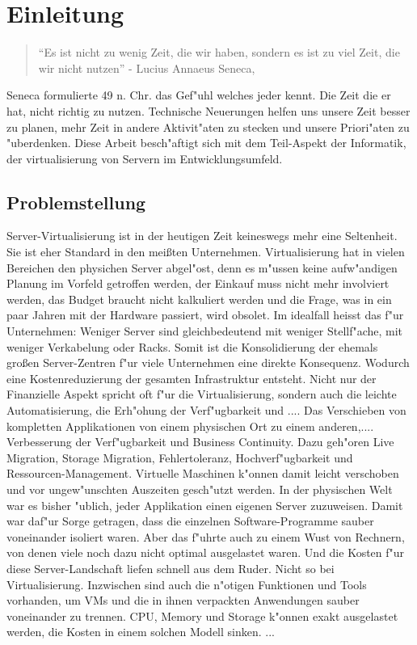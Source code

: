\chapter{Einleitung}

\begin{quote}
	``Es ist nicht zu wenig Zeit, die wir haben, sondern es ist zu viel Zeit, die wir nicht nutzen'' - Lucius Annaeus Seneca, \cite{Apelt200511}
\end{quote}
Seneca formulierte  49 n. Chr. das Gef"uhl welches jeder kennt. Die Zeit die er hat, nicht richtig zu nutzen.
Technische Neuerungen helfen uns unsere Zeit besser zu planen, mehr Zeit in andere Aktivit"aten zu stecken und unsere Priori"aten zu "uberdenken.
Diese Arbeit besch"aftigt sich mit dem Teil-Aspekt der Informatik, der virtualisierung von Servern im Entwicklungsumfeld.

\section{Problemstellung}
Server-Virtualisierung ist in der heutigen Zeit keineswegs mehr eine Seltenheit. Sie ist eher Standard in den mei{\ss}ten Unternehmen.\newline
Virtualisierung hat in vielen Bereichen den physichen Server abgel"ost, denn es m"ussen keine aufw"andigen Planung im Vorfeld getroffen werden, der Einkauf muss nicht mehr involviert werden, das Budget braucht nicht kalkuliert werden und die Frage, was in ein paar Jahren mit der Hardware passiert, wird obsolet.\newline
Im idealfall heisst das f"ur Unternehmen: Weniger Server sind gleichbedeutend mit weniger Stellf"ache, mit weniger Verkabelung oder Racks. Somit ist die Konsolidierung der ehemals gro{\ss}en Server-Zentren f"ur viele Unternehmen eine direkte Konsequenz. 
Wodurch eine Kostenreduzierung der gesamten Infrastruktur entsteht.\newline
Nicht nur der Finanzielle Aspekt spricht oft f"ur die Virtualisierung, sondern auch die leichte Automatisierung, die Erh"ohung der Verf"ugbarkeit und ....\newline
Das Verschieben von kompletten Applikationen von einem physischen Ort zu einem anderen,....\newline
Verbesserung der Verf"ugbarkeit und Business Continuity. Dazu geh"oren Live Migration, Storage Migration, Fehlertoleranz, Hochverf"ugbarkeit und Ressourcen-Management. Virtuelle Maschinen k"onnen damit leicht verschoben und vor ungew"unschten Auszeiten gesch"utzt werden.\newline
In der physischen Welt war es bisher "ublich, jeder Applikation einen eigenen Server zuzuweisen. Damit war daf"ur Sorge getragen, dass die einzelnen Software-Programme sauber voneinander isoliert waren. Aber das f"uhrte auch zu einem Wust von Rechnern, von denen viele noch dazu nicht optimal ausgelastet waren. Und die Kosten f"ur diese Server-Landschaft liefen schnell aus dem Ruder. Nicht so bei Virtualisierung. Inzwischen sind auch die n"otigen Funktionen und Tools vorhanden, um VMs und die in ihnen verpackten Anwendungen sauber voneinander zu trennen. CPU, Memory und Storage k"onnen exakt ausgelastet werden, die Kosten in einem solchen Modell sinken.
...

